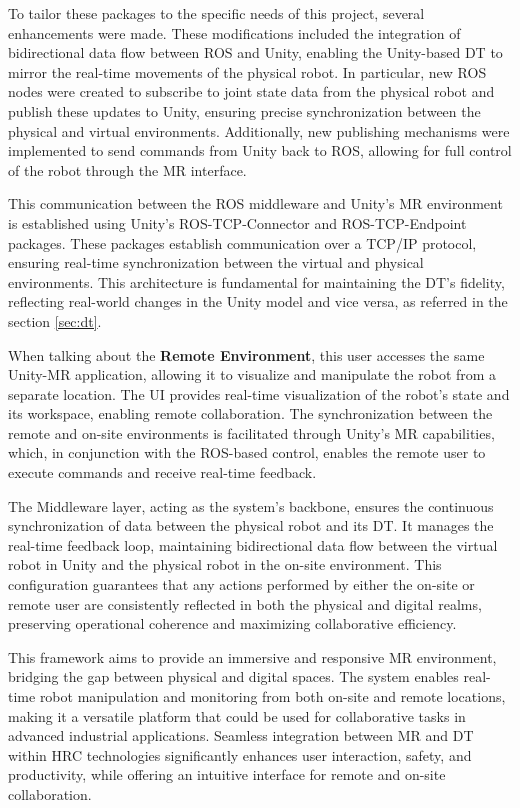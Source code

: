To tailor these packages to the specific needs of this project, several enhancements were made. These modifications included the integration of bidirectional data flow between \ac{ROS} and Unity, enabling the Unity-based \ac{DT} to mirror the real-time movements of the physical robot. In particular, new \ac{ROS} nodes were created to subscribe to joint state data from the physical robot and publish these updates to Unity, ensuring precise synchronization between the physical and virtual environments. Additionally, new publishing mechanisms were implemented to send commands from Unity back to \ac{ROS}, allowing for full control of the robot through the \ac{MR} interface. 

This communication between the \ac{ROS} middleware and Unity’s \ac{MR} environment is established using Unity’s \ac{ROS}-\ac{TCP}-Connector and \ac{ROS}-\ac{TCP}-Endpoint packages. These packages establish communication over a \ac{TCP}/\ac{IP} protocol, ensuring real-time synchronization between the virtual and physical environments. This architecture is fundamental for maintaining the \ac{DT}'s fidelity, reflecting real-world changes in the Unity model and vice versa, as referred in the section \ref{sec:dt}.

When talking about the \textbf{Remote Environment}, this user accesses the same Unity-\ac{MR} application, allowing it to visualize and manipulate the robot from a separate location. The \ac{UI} provides real-time visualization of the robot’s state and its workspace, enabling remote collaboration. The synchronization between the remote and on-site environments is facilitated through Unity’s \ac{MR} capabilities, which, in conjunction with the \ac{ROS}-based control, enables the remote user to execute commands and receive real-time feedback.

The Middleware layer, acting as the system’s backbone, ensures the continuous synchronization of data between the physical robot and its \ac{DT}. It manages the real-time feedback loop, maintaining bidirectional data flow between the virtual robot in Unity and the physical robot in the on-site environment. This configuration guarantees that any actions performed by either the on-site or remote user are consistently reflected in both the physical and digital realms, preserving operational coherence and maximizing collaborative efficiency.

This framework aims to provide an immersive and responsive \ac{MR} environment, bridging the gap between physical and digital spaces. The system enables real-time robot manipulation and monitoring from both on-site and remote locations, making it a versatile platform that could be used for collaborative tasks in advanced industrial applications. Seamless integration between \ac{MR} and \ac{DT} within \ac{HRC} technologies significantly enhances user interaction, safety, and productivity, while offering an intuitive interface for remote and on-site collaboration.


